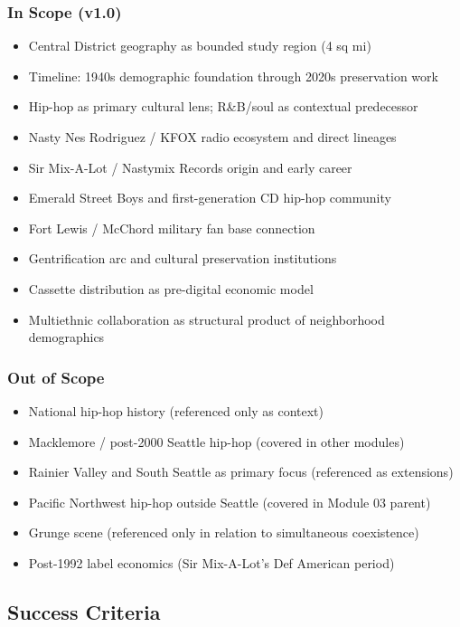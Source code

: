 \documentclass[11pt,letterpaper]{article}
\begin{document}
\subsubsection{In Scope (v1.0)}
\begin{itemize}[noitemsep]
  \item Central District geography as bounded study region (4 sq mi)
  \item Timeline: 1940s demographic foundation through 2020s preservation work
  \item Hip-hop as primary cultural lens; R\&B/soul as contextual predecessor
  \item Nasty Nes Rodriguez / KFOX radio ecosystem and direct lineages
  \item Sir Mix-A-Lot / Nastymix Records origin and early career
  \item Emerald Street Boys and first-generation CD hip-hop community
  \item Fort Lewis / McChord military fan base connection
  \item Gentrification arc and cultural preservation institutions
  \item Cassette distribution as pre-digital economic model
  \item Multiethnic collaboration as structural product of neighborhood demographics
\end{itemize}

\subsubsection{Out of Scope}
\begin{itemize}[noitemsep]
  \item National hip-hop history (referenced only as context)
  \item Macklemore / post-2000 Seattle hip-hop (covered in other modules)
  \item Rainier Valley and South Seattle as primary focus (referenced as extensions)
  \item Pacific Northwest hip-hop outside Seattle (covered in Module 03 parent)
  \item Grunge scene (referenced only in relation to simultaneous coexistence)
  \item Post-1992 label economics (Sir Mix-A-Lot's Def American period)
\end{itemize}

\subsection{Success Criteria}
\end{document}
